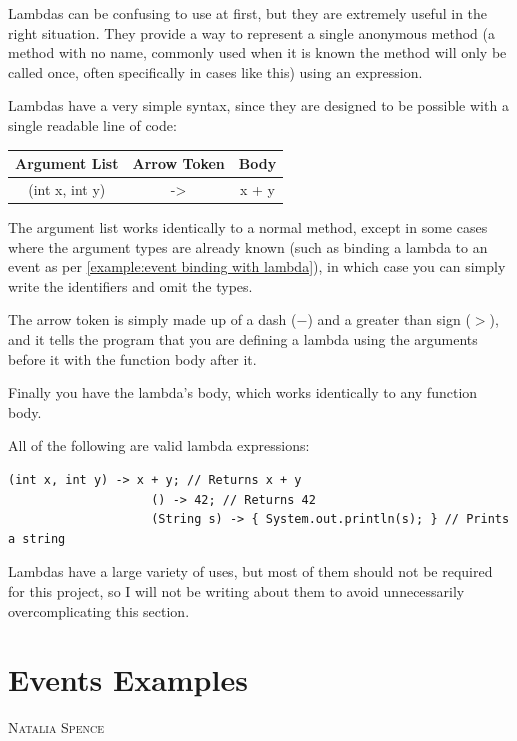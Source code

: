 \documentclass[a4paper]{report}
\makeatletter
\newcommand{\sectionauthor}[1]{%
	{\parindent0pt\vspace*{0pt}%
		\linespread{1.1}\large\scshape#1%
		\par\nobreak\vspace*{10pt}}
	\@afterheading%
}
\makeatother
\begin{document}
				Lambdas can be confusing to use at first, but they are extremely useful in the right situation. They provide a way to represent a single anonymous method (a method with no name, commonly used when it is known the method will only be called once, often specifically in cases like this) using an expression.
				
				Lambdas have a very simple syntax, since they are designed to be possible with a single readable line of code:
				
				\setlength{\tabcolsep}{10pt}
				\def\arraystretch{1.4}
				\begin{center}
					\begin{tabular}{c c c}
						\hline
						Argument List & Arrow Token & Body \\
						\hline
						(int x, int y) & -> & x + y \\
						\hline
					\end{tabular}
				\end{center}
				
				The argument list works identically to a normal method, except in some cases where the argument types are already known (such as binding a lambda to an event as per \cref{example:event binding with lambda}), in which case you can simply write the identifiers and omit the types.
				
				The arrow token is simply made up of a dash ($-$) and a greater than sign ($>$), and it tells the program that you are defining a lambda using the arguments before it with the function body after it.
				
				Finally you have the lambda's body, which works identically to any function body.
				
				All of the following are valid lambda expressions:
				
				\begin{lstlisting}[gobble=20]
					(int x, int y) -> x + y; // Returns x + y
					() -> 42; // Returns 42
					(String s) -> { System.out.println(s); } // Prints a string
				\end{lstlisting}
				
				Lambdas have a large variety of uses, but most of them should not be required for this project, so I will not be writing about them to avoid unnecessarily overcomplicating this section.
			
		\section{Events Examples}\label{sec:events examples}
		\sectionauthor{Natalia Spence}
		
\end{document}
